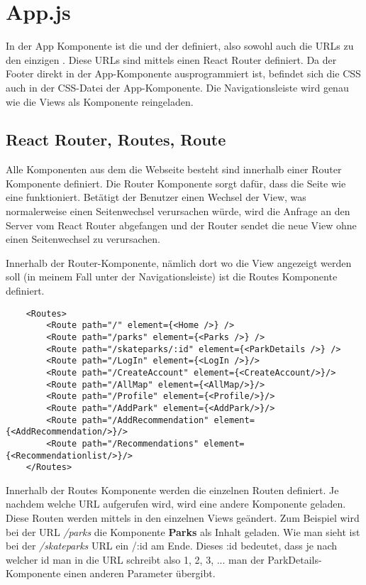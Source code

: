 \section{App.js}
\label{appDatei}

In der App Komponente ist die  und der  definiert, 
also sowohl auch die URLs zu den einzigen . Diese URLs sind mittels einen React 
Router definiert. Da der Footer direkt in der App-Komponente ausprogrammiert ist, 
befindet sich die CSS auch in der CSS-Datei der App-Komponente. Die Navigationsleiste wird genau 
wie die Views als Komponente reingeladen.

\subsection{React Router, Routes, Route}
Alle Komponenten aus dem die Webseite besteht sind innerhalb einer Router Komponente definiert. Die 
Router Komponente sorgt dafür, dass die Seite wie eine  funktioniert. Betätigt
der Benutzer einen Wechsel der View, was normalerweise einen Seitenwechsel verursachen würde, wird die 
Anfrage an den Server vom React Router abgefangen und der Router sendet die neue View ohne einen 
Seitenwechsel zu verursachen. 


Innerhalb der Router-Komponente, nämlich dort wo die View angezeigt werden soll (in meinem Fall unter
der Navigationsleiste) ist die Routes Komponente definiert.
\begin{lstlisting}
    <Routes>
        <Route path="/" element={<Home />} />
        <Route path="/parks" element={<Parks />} />
        <Route path="/skateparks/:id" element={<ParkDetails />} />
        <Route path="/LogIn" element={<LogIn />}/>
        <Route path="/CreateAccount" element={<CreateAccount/>}/>
        <Route path="/AllMap" element={<AllMap/>}/>
        <Route path="/Profile" element={<Profile/>}/>
        <Route path="/AddPark" element={<AddPark/>}/>
        <Route path="/AddRecommendation" element={<AddRecommendation/>}/>
        <Route path="/Recommendations" element={<Recommendationlist/>}/>
    </Routes>
\end{lstlisting} 
Innerhalb der Routes Komponente werden die einzelnen Routen definiert. Je nachdem welche URL aufgerufen wird,
wird eine andere Komponente geladen. Diese Routen werden mittels  in den einzelnen 
Views geändert. Zum Beispiel wird bei der URL \textit{/parks} die Komponente \textbf{Parks} als 
Inhalt geladen. Wie man sieht ist bei der \textit{/skateparks} URL ein /:id am Ende. Dieses :id 
bedeutet, dass je nach welcher id man in die URL schreibt also 1, 2, 3, ... man der 
ParkDetails-Komponente einen anderen Parameter übergibt. 

